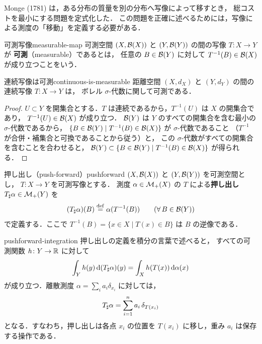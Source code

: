 Monge (1781) は，ある分布の質量を別の分布へ写像によって移すとき，
総コストを最小にする問題を定式化した．
この問題を正確に述べるためには，写像による測度の「移動」を定義する必要がある．

\begin{definition}{可測写像}{measurable-map}
  可測空間 $(X, \mathcal{B}(X))$ と $(Y, \mathcal{B}(Y))$ の間の写像 $T \colon X \to Y$ が
  \textbf{可測}（measurable）であるとは，
  任意の $B \in \mathcal{B}(Y)$ に対して $T^{-1}(B) \in \mathcal{B}(X)$ が成り立つことをいう．
\end{definition}

\begin{proposition}{連続写像は可測}{continuous-is-measurable}
  距離空間 $(X, d_X)$ と $(Y, d_Y)$ の間の連続写像 $T \colon X \to Y$ は，
  ボレル $\sigma$-代数に関して可測である．
\end{proposition}

\begin{proof}
  $U \subset Y$ を開集合とする．$T$ は連続であるから，$T^{-1}(U)$ は $X$ の開集合であり，
  $T^{-1}(U) \in \mathcal{B}(X)$ が成り立つ．
  $\mathcal{B}(Y)$ は $Y$ のすべての開集合を含む最小の $\sigma$-代数であるから，
  $\{B \in \mathcal{B}(Y) \mid T^{-1}(B) \in \mathcal{B}(X)\}$ が $\sigma$-代数であること
  （$T^{-1}$ が合併・補集合と可換であることから従う）と，
  この $\sigma$-代数がすべての開集合を含むことを合わせると，
  $\mathcal{B}(Y) \subset \{B \in \mathcal{B}(Y) \mid T^{-1}(B) \in \mathcal{B}(X)\}$ が得られる．
\end{proof}

\begin{definition}{押し出し（push-forward）}{pushforward}
  $(X, \mathcal{B}(X))$ と $(Y, \mathcal{B}(Y))$ を可測空間とし，
  $T \colon X \to Y$ を可測写像とする．
  測度 $\alpha \in \mathcal{M}_+(X)$ の $T$ による\textbf{押し出し}
  $T_\sharp \alpha \in \mathcal{M}_+(Y)$ を
  \[
    (T_\sharp \alpha)(B) \overset{\mathrm{def}}{=} \alpha(T^{-1}(B))
    \qquad (\forall\, B \in \mathcal{B}(Y))
  \]
  で定義する．ここで $T^{-1}(B) = \{x \in X \mid T(x) \in B\}$ は $B$ の逆像である．
\end{definition}

\begin{remark}{}{pushforward-integration}
  押し出しの定義を積分の言葉で述べると，
  すべての可測関数 $h \colon Y \to \mathbb{R}$ に対して
  \[
    \int_Y h(y) \, \mathrm{d}(T_\sharp \alpha)(y) = \int_X h(T(x)) \, \mathrm{d}\alpha(x)
  \]
  が成り立つ．離散測度 $\alpha = \sum_i a_i \delta_{x_i}$ に対しては，
  \[
    T_\sharp \alpha = \sum_{i=1}^n a_i \, \delta_{T(x_i)}
  \]
  となる．すなわち，押し出しは各点 $x_i$ の位置を $T(x_i)$ に移し，重み $a_i$ は保存する操作である．
\end{remark}

